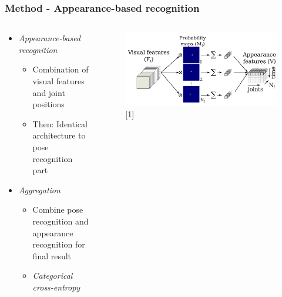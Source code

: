 \documentclass[9pt]{beamer}
\providecommand{\sourcefix}[1]{\\ \footnotesize \tugreen{Source:} [#1]}
\newenvironment{myframe}[1][]{%
\begin{frame}%
\frametitle{#1}
\setcounter{footnote}{0}


}{%
\end{frame}%
}
\begin{document}
\begin{myframe}[Method - Appearance-based recognition]
    	\begin{columns}[T]
        \begin{column}{.45\textwidth}
            \begin{itemize}
                \item \textit{Appearance-based recognition}
                \begin{itemize}
                    \item Combination of visual features and joint positions
                    \item Then: Identical architecture to pose recognition part
                \end{itemize}
                \item \textit{Aggregation}
                \begin{itemize}
                    \item Combine pose recognition and appearance recognition for final result
                    \item \textit{Categorical cross-entropy}
                \end{itemize}
            \end{itemize}
        \end{column}
        \begin{column}{.45\textwidth}
            \begin{figure}
                \includegraphics[width=.99\textwidth]{appearance-features.png}
                \sourcefix{1}
            \end{figure}
        \end{column}
	\end{columns}
\end{myframe}
\end{document}
